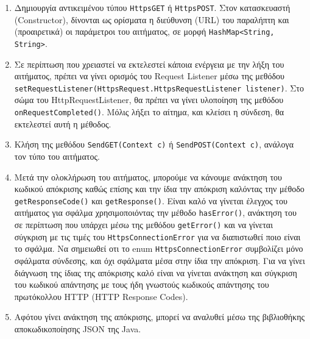 	\begin{enumerate}
		\item Δημιουργία αντικειμένου τύπου \verb|HttpsGET| ή \verb|HttpsPOST|. Στον κατασκευαστή (Constructor), δίνονται ως ορίσματα η διεύθυνση (URL) του παραλήπτη και (προαιρετικά) οι παράμετροι του αιτήματος, σε μορφή \verb|HashMap<String, String>|.
		\item Σε περίπτωση που χρειαστεί να εκτελεστεί κάποια ενέργεια με την λήξη του αιτήματος, πρέπει να γίνει ορισμός του Request Listener μέσω της μεθόδου \verb|setRequestListener(HttpsRequest.HttpsRequestListener listener)|. Στο σώμα του HttpRequestListener, θα πρέπει να γίνει υλοποίηση της μεθόδου \verb|onRequestCompleted()|. Μόλις λήξει το αίτημα, και κλείσει η σύνδεση, θα εκτελεστεί αυτή η μέθοδος.
		\item Κλήση της μεθόδου \verb|SendGET(Context c)| ή \verb|SendPOST(Context c)|, ανάλογα τον τύπο του αιτήματος.
		\item Μετά την ολοκλήρωση του αιτήματος, μπορούμε να κάνουμε ανάκτηση του κωδικού απόκρισης καθώς επίσης και την ίδια την απόκριση καλόντας την μέθοδο \verb|getResponseCode()| και \verb|getResponse()|. Είναι καλό να γίνεται έλεγχος του αιτήματος για σφάλμα χρησιμοποιόντας την μέθοδο \verb|hasError()|, ανάκτηση του σε περίπτωση που υπάρχει μέσω της μεθόδου \verb|getError()| και να γίνεται σύγκριση με τις τιμές του \verb|HttpsConnectionError| για να διαπιστωθεί ποιο είναι το σφάλμα. Να σημειωθεί οτι το enum \verb|HttpsConnectionError| συμβολίζει μόνο σφάλματα σύνδεσης, και όχι σφάλματα μέσα στην ίδια την απόκριση. Για να γίνει διάγνωση της ίδιας της απόκρισης καλό είναι να γίνεται ανάκτηση και σύγκριση του κωδικού απάντησης με τους ήδη γνωστούς κωδικούς απάντησης του πρωτόκολλου HTTP (HTTP Response Codes).
		\item Αφότου γίνει ανάκτηση της απόκρισης, μπορεί να αναλυθεί μέσω της βιβλιοθήκης αποκωδικοποίησης JSON της Java.
	\end{enumerate}
